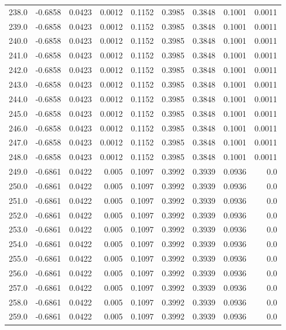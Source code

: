 \begin{longtable}{lrrrrrrrr}
238.0 & -0.6858 & 0.0423 & 0.0012 & 0.1152 & 0.3985 & 0.3848 & 0.1001 & 0.0011 \\
239.0 & -0.6858 & 0.0423 & 0.0012 & 0.1152 & 0.3985 & 0.3848 & 0.1001 & 0.0011 \\
240.0 & -0.6858 & 0.0423 & 0.0012 & 0.1152 & 0.3985 & 0.3848 & 0.1001 & 0.0011 \\
241.0 & -0.6858 & 0.0423 & 0.0012 & 0.1152 & 0.3985 & 0.3848 & 0.1001 & 0.0011 \\
242.0 & -0.6858 & 0.0423 & 0.0012 & 0.1152 & 0.3985 & 0.3848 & 0.1001 & 0.0011 \\
243.0 & -0.6858 & 0.0423 & 0.0012 & 0.1152 & 0.3985 & 0.3848 & 0.1001 & 0.0011 \\
244.0 & -0.6858 & 0.0423 & 0.0012 & 0.1152 & 0.3985 & 0.3848 & 0.1001 & 0.0011 \\
245.0 & -0.6858 & 0.0423 & 0.0012 & 0.1152 & 0.3985 & 0.3848 & 0.1001 & 0.0011 \\
246.0 & -0.6858 & 0.0423 & 0.0012 & 0.1152 & 0.3985 & 0.3848 & 0.1001 & 0.0011 \\
247.0 & -0.6858 & 0.0423 & 0.0012 & 0.1152 & 0.3985 & 0.3848 & 0.1001 & 0.0011 \\
248.0 & -0.6858 & 0.0423 & 0.0012 & 0.1152 & 0.3985 & 0.3848 & 0.1001 & 0.0011 \\
249.0 & -0.6861 & 0.0422 & 0.005 & 0.1097 & 0.3992 & 0.3939 & 0.0936 & 0.0 \\
250.0 & -0.6861 & 0.0422 & 0.005 & 0.1097 & 0.3992 & 0.3939 & 0.0936 & 0.0 \\
251.0 & -0.6861 & 0.0422 & 0.005 & 0.1097 & 0.3992 & 0.3939 & 0.0936 & 0.0 \\
252.0 & -0.6861 & 0.0422 & 0.005 & 0.1097 & 0.3992 & 0.3939 & 0.0936 & 0.0 \\
253.0 & -0.6861 & 0.0422 & 0.005 & 0.1097 & 0.3992 & 0.3939 & 0.0936 & 0.0 \\
254.0 & -0.6861 & 0.0422 & 0.005 & 0.1097 & 0.3992 & 0.3939 & 0.0936 & 0.0 \\
255.0 & -0.6861 & 0.0422 & 0.005 & 0.1097 & 0.3992 & 0.3939 & 0.0936 & 0.0 \\
256.0 & -0.6861 & 0.0422 & 0.005 & 0.1097 & 0.3992 & 0.3939 & 0.0936 & 0.0 \\
257.0 & -0.6861 & 0.0422 & 0.005 & 0.1097 & 0.3992 & 0.3939 & 0.0936 & 0.0 \\
258.0 & -0.6861 & 0.0422 & 0.005 & 0.1097 & 0.3992 & 0.3939 & 0.0936 & 0.0 \\
259.0 & -0.6861 & 0.0422 & 0.005 & 0.1097 & 0.3992 & 0.3939 & 0.0936 & 0.0 \\

\end{longtable}
